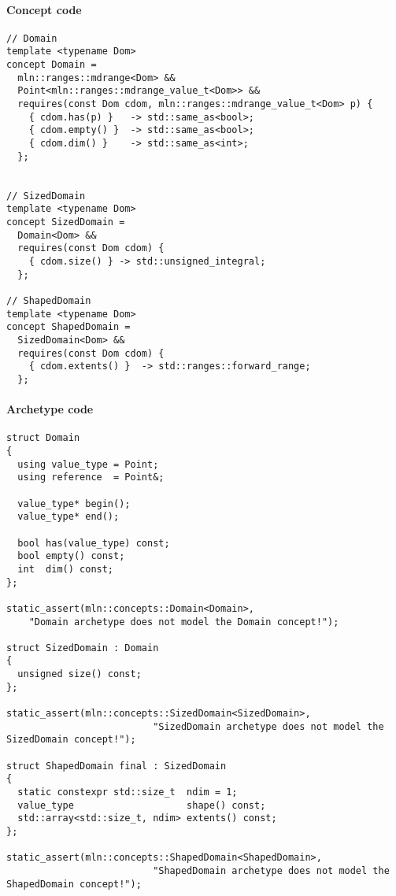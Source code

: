 \paragraph{Concept code}

\begin{verbatim}
// Domain
template <typename Dom>
concept Domain =
  mln::ranges::mdrange<Dom> &&
  Point<mln::ranges::mdrange_value_t<Dom>> &&
  requires(const Dom cdom, mln::ranges::mdrange_value_t<Dom> p) {
    { cdom.has(p) }   -> std::same_as<bool>;
    { cdom.empty() }  -> std::same_as<bool>;
    { cdom.dim() }    -> std::same_as<int>;
  };


// SizedDomain
template <typename Dom>
concept SizedDomain =
  Domain<Dom> &&
  requires(const Dom cdom) {
    { cdom.size() } -> std::unsigned_integral;
  };

// ShapedDomain
template <typename Dom>
concept ShapedDomain =
  SizedDomain<Dom> &&
  requires(const Dom cdom) {
    { cdom.extents() }  -> std::ranges::forward_range;
  };
\end{verbatim}

\paragraph{Archetype code}

\begin{verbatim}
struct Domain
{
  using value_type = Point;
  using reference  = Point&;

  value_type* begin();
  value_type* end();

  bool has(value_type) const;
  bool empty() const;
  int  dim() const;
};

static_assert(mln::concepts::Domain<Domain>,
    "Domain archetype does not model the Domain concept!");

struct SizedDomain : Domain
{
  unsigned size() const;
};

static_assert(mln::concepts::SizedDomain<SizedDomain>,
                          "SizedDomain archetype does not model the SizedDomain concept!");

struct ShapedDomain final : SizedDomain
{
  static constexpr std::size_t  ndim = 1;
  value_type                    shape() const;
  std::array<std::size_t, ndim> extents() const;
};

static_assert(mln::concepts::ShapedDomain<ShapedDomain>,
                          "ShapedDomain archetype does not model the ShapedDomain concept!");
\end{verbatim}


